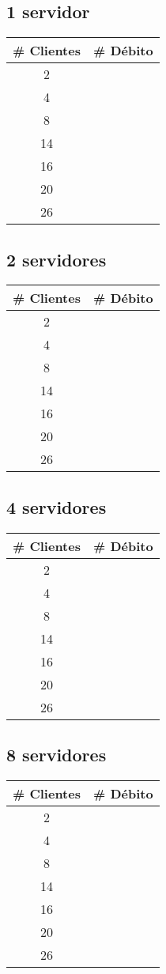 \subsection{1 servidor}
\begin{tabular}{|c|c|}
\hline
\textbf{\# Clientes} & \textbf{\# Débito} \\ \hline
2 &  \\ \hline
4 &  \\ \hline
8 &  \\ \hline
14 &  \\ \hline
16 &  \\ \hline
20 &  \\ \hline
26 &  \\ \hline
\end{tabular}

\subsection{2 servidores}
\begin{tabular}{|c|c|}
\hline
\textbf{\# Clientes} & \textbf{\# Débito} \\ \hline
2 &  \\ \hline
4 &  \\ \hline
8 &  \\ \hline
14 &  \\ \hline
16 &  \\ \hline
20 &  \\ \hline
26 &  \\ \hline
\end{tabular}

\subsection{4 servidores}
\begin{tabular}{|c|c|}
\hline
\textbf{\# Clientes} & \textbf{\# Débito} \\ \hline
2 &  \\ \hline
4 &  \\ \hline
8 &  \\ \hline
14 &  \\ \hline
16 &  \\ \hline
20 &  \\ \hline
26 &  \\ \hline
\end{tabular}

\subsection{8 servidores}
\begin{tabular}{|c|c|}
\hline
\textbf{\# Clientes} & \textbf{\# Débito} \\ \hline
2 &  \\ \hline
4 &  \\ \hline
8 &  \\ \hline
14 &  \\ \hline
16 &  \\ \hline
20 &  \\ \hline
26 &  \\ \hline
\end{tabular}
